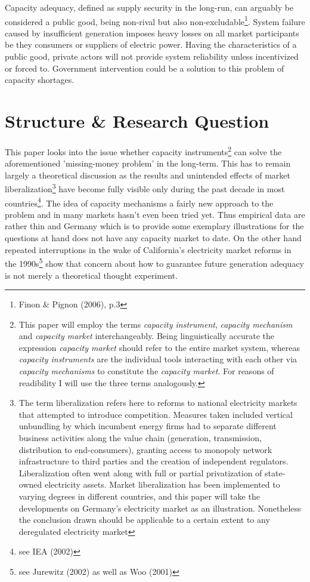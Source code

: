 \documentclass[11pt,a4paper,english]{scrreprt}
\begin{document}
Capacity adequacy, defined as supply security in the long-run, can arguably be
considered a public good, being non-rival but also non-excludable\footnote{Finon
\& Pignon (2006), p.3}. System failure caused by insufficient generation imposes
heavy losses on all market participants be they consumers or suppliers of
electric power. Having the characteristics of a public good, private actors will
not provide system reliability unless incentivized or forced to. Government
intervention could be a solution to this problem of capacity shortages.\par



\chapter{Structure \& Research Question}
	

This paper looks into the issue whether capacity instruments\footnote{This paper
will employ the terms \emph{capacity instrument}, \emph{capacity mechanism} and
\emph{capacity market} interchangeably. Being linguistically accurate the
expression \emph{capacity market} should refer to the entire market system,
whereas \emph{capacity instruments} are the individual tools interacting with
each other via \emph{capacity mechanisms} to constitute the \emph{capacity
market}. For reasons of readibility I will use the three terms analogously.} can
solve the aforementioned 'missing-money problem' in the long-term. This has to
remain largely a theoretical discussion as the results and unintended effects of
market liberalization\footnote{The term liberalization refers here to reforms to
national electricity markets that attempted to introduce competition. Measures
taken included vertical unbundling by which incumbent energy firms had to
separate different business activities along the value chain (generation,
transmission, distribution to end-consumers), granting access to monopoly
network infrastructure to third parties and the creation of independent
regulators. Liberalization often went along with full or partial privatization
of state-owned electricity assets. Market liberalization has been implemented to
varying degrees in different countries, and this paper will take the
developments on Germany's electricity market as an illustration. Nonetheless the
conclusion drawn should be applicable to a certain extent to any deregulated
electricity market} have become fully visible only during the past decade in
most countries\footnote{see IEA (2002)}. The idea of capacity mechanisms a
fairly new approach to the problem and in many markets hasn't even been tried
yet. Thus empirical data are rather thin and Germany which is to provide some
exemplary illustrations for the questions at hand does not have any capacity
market to date. On the other hand repeated interruptions in the wake of
California's electricity market reforms in the 1990s\footnote{see Jurewitz
(2002) as well as Woo (2001)} show that concern about how to guarantee future
generation adequacy is not merely a theoretical thought experiment.\par
\end{document}
